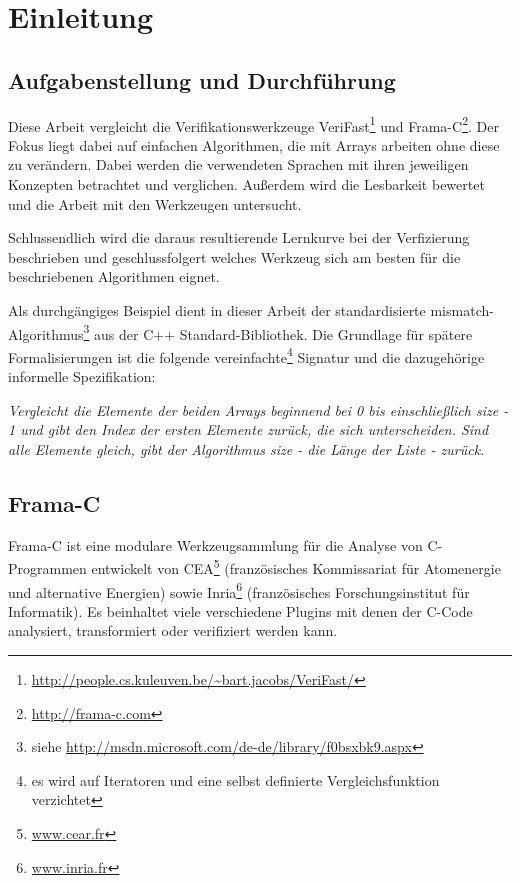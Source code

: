 ﻿\chapter{Einleitung}

\section{Aufgabenstellung und Durchführung}
\label{sec:aufgabenstellung}
Diese Arbeit vergleicht die Verifikationswerkzeuge VeriFast\footnote{
\url{http://people.cs.kuleuven.be/~bart.jacobs/VeriFast/}} und Frama-C\footnote{\url{http://frama-c.com}}.
Der Fokus liegt dabei auf einfachen Algorithmen, die mit Arrays arbeiten ohne diese zu verändern.
Dabei werden die verwendeten Sprachen mit ihren jeweiligen Konzepten betrachtet und verglichen. Außerdem
wird die Lesbarkeit bewertet und die Arbeit mit den Werkzeugen untersucht. 

Schlussendlich wird die daraus resultierende Lernkurve bei der Verfizierung beschrieben und geschlussfolgert
welches Werkzeug sich am besten für die beschriebenen Algorithmen eignet.

Als durchgängiges Beispiel dient in dieser Arbeit der standardisierte mismatch-Algorithmus\footnote{siehe
\url{http://msdn.microsoft.com/de-de/library/f0bsxbk9.aspx}} aus
der C++ Standard-Bibliothek. Die Grundlage für spätere Formalisierungen ist die folgende vereinfachte\footnote{es
wird auf Iteratoren und eine selbst definierte Vergleichsfunktion verzichtet} Signatur und 
die dazugehörige informelle Spezifikation:

\lstset{frame=none}    

\lstset{frame=single}

\noindent \emph{Vergleicht die Elemente der beiden Arrays beginnend bei 0 bis einschließlich size - 1 und gibt den
Index der ersten Elemente zurück, die sich unterscheiden. Sind alle Elemente gleich, gibt der Algorithmus
size - die Länge der Liste - zurück.}


\section{Frama-C}
\label{acsl-und-frama-c}

Frama-C ist eine modulare Werkzeugsammlung für die Analyse von C-Programmen entwickelt von CEA\footnote{\url{www.cear.fr}}
(französisches Kommissariat für Atomenergie und alternative Energien) sowie Inria\footnote{\url{www.inria.fr}} 
(französisches Forschungsinstitut für Informatik). Es beinhaltet viele verschiedene Plugins mit denen der C-Code
analysiert, transformiert oder verifiziert werden kann. 

